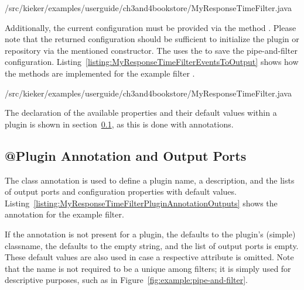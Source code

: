 \setJavaCodeListing
%
{\customComponentsBookstoreApplicationDir/src/kieker/examples/userguide/ch3and4bookstore/MyResponseTimeFilter.java}

\noindent Additionally, the %
current configuration must be provided via the method %
. Please note that the returned configuration %
should be sufficient to initialize the plugin or repository via the mentioned constructor. %
The  uses the  to %
save the pipe-and-filter configuration. Listing~\ref{listing:MyResponseTimeFilterEventsToOutput} %
shows how the methods are implemented for the example filter . %

\enlargethispage{1cm}

\setJavaCodeListing
%
{\customComponentsBookstoreApplicationDir/src/kieker/examples/userguide/ch3and4bookstore/MyResponseTimeFilter.java}

\noindent The declaration of the available properties and their default values within a plugin is shown in section~\ref{sec:analysis:pluginAnnotation}, as this is done with annotations.


\subsection{@Plugin Annotation and Output Ports}\label{sec:analysis:pluginAnnotation}

\noindent The  class annotation is used to define a %
plugin name, a description, and the lists of output ports and configuration %
properties with default values. %
Listing~\ref{listing:MyResponseTimeFilterPluginAnnotationOutputs} shows the %
 annotation for the example filter.

\enlargethispage{1cm}

If the  annotation is not present for a plugin, the  %
defaults to the plugin's (simple) classname, the  defaults %
to the empty string, and the list of output ports is empty. These default values %
are also used in case a respective attribute is omitted. %
Note that the name is not required to be a unique among filters; it is simply %
used for descriptive purposes, such as in Figure~\ref{fig:example:pipe-and-filter}. %

